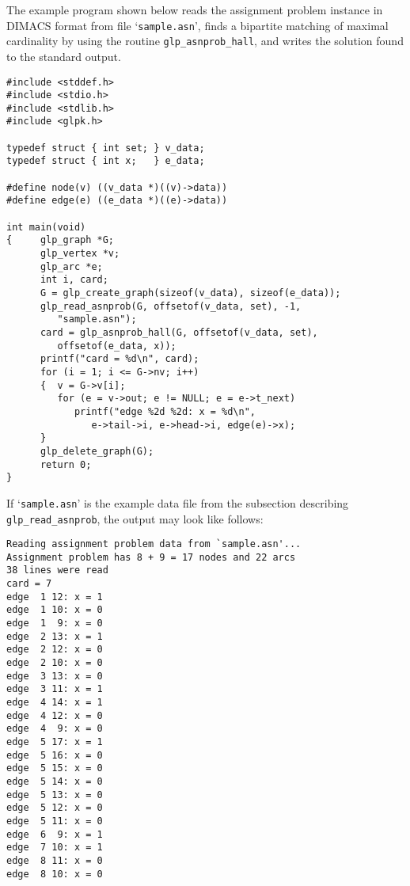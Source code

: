 \documentclass[11pt]{report}
\def\para#1{\noindent{\bf#1}}
\begin{document}
\para{Example}

The example program shown below reads the assignment problem instance
in DIMACS format from file `\verb|sample.asn|', finds a bipartite
matching of maximal cardinality by using the routine
\verb|glp_asnprob_hall|, and writes the solution found to the standard
output.

\begin{footnotesize}
\begin{verbatim}
#include <stddef.h>
#include <stdio.h>
#include <stdlib.h>
#include <glpk.h>

typedef struct { int set; } v_data;
typedef struct { int x;   } e_data;

#define node(v) ((v_data *)((v)->data))
#define edge(e) ((e_data *)((e)->data))

int main(void)
{     glp_graph *G;
      glp_vertex *v;
      glp_arc *e;
      int i, card;
      G = glp_create_graph(sizeof(v_data), sizeof(e_data));
      glp_read_asnprob(G, offsetof(v_data, set), -1,
         "sample.asn");
      card = glp_asnprob_hall(G, offsetof(v_data, set),
         offsetof(e_data, x));
      printf("card = %d\n", card);
      for (i = 1; i <= G->nv; i++)
      {  v = G->v[i];
         for (e = v->out; e != NULL; e = e->t_next)
            printf("edge %2d %2d: x = %d\n",
               e->tail->i, e->head->i, edge(e)->x);
      }
      glp_delete_graph(G);
      return 0;
}
\end{verbatim}
\end{footnotesize}

If `\verb|sample.asn|' is the example data file from the subsection
describing \verb|glp_read_asnprob|, the output may look like follows:

\begin{footnotesize}
\begin{verbatim}
Reading assignment problem data from `sample.asn'...
Assignment problem has 8 + 9 = 17 nodes and 22 arcs
38 lines were read
card = 7
edge  1 12: x = 1
edge  1 10: x = 0
edge  1  9: x = 0
edge  2 13: x = 1
edge  2 12: x = 0
edge  2 10: x = 0
edge  3 13: x = 0
edge  3 11: x = 1
edge  4 14: x = 1
edge  4 12: x = 0
edge  4  9: x = 0
edge  5 17: x = 1
edge  5 16: x = 0
edge  5 15: x = 0
edge  5 14: x = 0
edge  5 13: x = 0
edge  5 12: x = 0
edge  5 11: x = 0
edge  6  9: x = 1
edge  7 10: x = 1
edge  8 11: x = 0
edge  8 10: x = 0
\end{verbatim}
\end{footnotesize}

\end{document}
